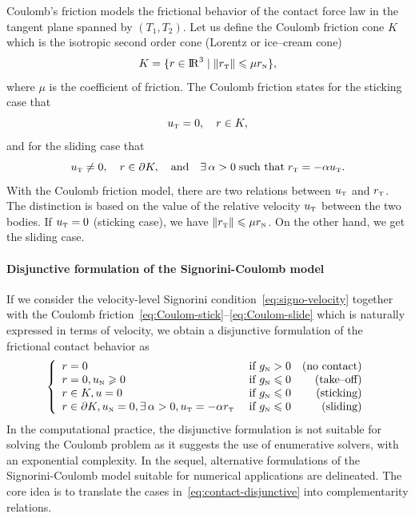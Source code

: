 {Coulomb's friction  models the frictional behavior of the contact force law in the tangent plane { spanned by $(T_1,T_2)$}. Let us define the Coulomb friction  cone $K$ which is the isotropic second order cone (Lorentz or ice--cream cone)
\begin{equation}
  \label{eq:CoulombCone}
  K = \{r \in \RR^3 \mid \|r_\t\| \leq \mu r_\n\},
\end{equation}
where $\mu$ is the coefficient of friction. The Coulomb friction  states for the sticking case that 
\begin{equation}
  \label{eq:Coulom-stick}
  u_{\t} =0,\quad r \in K,
\end{equation}
and for the sliding case that
\begin{equation}
  \label{eq:Coulom-slide}
  u_{\t}  \neq 0,\quad r \in \partial K, \quad\text{and}\quad\exists\, \alpha > 0\;\text{such that}\; r_\t = -\alpha u_\t.
\end{equation}
With the Coulomb friction model, there are two relations between $u_{\hbox{\tiny{T}}}$ and $r_{\hbox{\tiny{T}}}$. The distinction is based on the value of the relative velocity $u_{\hbox{\tiny{T}}}$ between the two bodies. If $u_{\hbox{\tiny{T}}}=0$ (sticking case), we have $\|r_{\hbox{\tiny{T}}}\| \leqslant \mu r_{\hbox{\tiny{N}}}$. On the other hand, we get the sliding case.

\paragraph{Disjunctive formulation of the Signorini-Coulomb model}

If we consider the velocity-level Signorini condition~\eqref{eq:signo-velocity} together with the Coulomb friction~\eqref{eq:Coulom-stick}--\eqref{eq:Coulom-slide} which is naturally expressed in terms of velocity, we obtain a disjunctive formulation of the frictional contact behavior as
\begin{equation}
  \label{eq:contact-disjunctive}
  \left\{\begin{array}{llr}
      r = 0  &\text{ if } g_{\n} > 0  & \text{(no contact)}\\
      r = 0,  u_\n \geq 0   &\text{ if } g_{\n} \leq 0 & \text{(take--off)} \\
      r \in K, u =0 &\text{ if } g_{\n} \leq 0 & \text{(sticking)}  \\
      r \in \partial K,u _\n=0,  \exists\,\alpha > 0, u_\t = -\alpha r_\t &\text{ if } g_{\n} \leq 0 & \text{(sliding)}  \\
\end{array}\right.
\end{equation}
In the computational practice, the disjunctive formulation is not suitable for  solving the Coulomb problem as it suggests the use of enumerative solvers, with an exponential complexity.
In the sequel, alternative formulations of the Signorini-Coulomb model suitable for numerical applications are delineated.
The core idea is to translate the cases in~\eqref{eq:contact-disjunctive} into complementarity relations.

}

